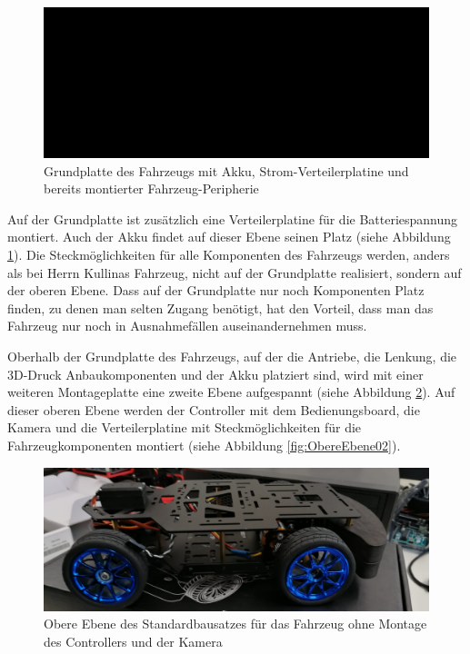 \begin{figure}[H] %
\includegraphics[width=.90\textwidth]{sec2/images/Grundaufbau/Grundplatte02} 
\centering
\captionsetup{width=.95\textwidth}
\caption[Grundplatte des Fahrzeugs]{Grundplatte des Fahrzeugs mit Akku, Strom-Verteilerplatine und bereits montierter Fahrzeug-Peripherie}\centering
\label{fig:Grundplatte02}
\end{figure}

Auf der Grundplatte ist zusätzlich eine Verteilerplatine für die Batteriespannung montiert. Auch der Akku findet auf dieser Ebene seinen Platz (siehe Abbildung \ref{fig:Grundplatte02}). Die Steckmöglichkeiten für alle Komponenten des Fahrzeugs werden, anders als bei Herrn Kullinas Fahrzeug, nicht auf der Grundplatte realisiert, sondern auf der oberen Ebene. Dass auf der Grundplatte nur noch Komponenten Platz finden, zu denen man selten Zugang benötigt, hat den Vorteil, dass man das Fahrzeug nur noch in Ausnahmefällen auseinandernehmen muss.\vspace{11pt}

Oberhalb der Grundplatte des Fahrzeugs, auf der die Antriebe, die Lenkung, die 3D-Druck Anbaukomponenten und der Akku platziert sind, wird mit einer weiteren Montageplatte eine zweite Ebene aufgespannt (siehe Abbildung \ref{fig:ObereEbene01}). Auf dieser oberen Ebene werden der Controller mit dem Bedienungsboard, die Kamera und die Verteilerplatine mit Steckmöglichkeiten für die Fahrzeugkomponenten montiert (siehe Abbildung \ref{fig:ObereEbene02}).

\begin{figure}[H] %
\includegraphics[width=.84\textwidth]{sec2/images/Grundaufbau/ObereEbene01} 
\centering
\captionsetup{width=.92\textwidth}
\caption[Obere Ebene des Standardbausatzes für das Fahrzeug]{Obere Ebene des Standardbausatzes für das Fahrzeug ohne Montage des Controllers und der Kamera}\centering
\label{fig:ObereEbene01}
\end{figure}

